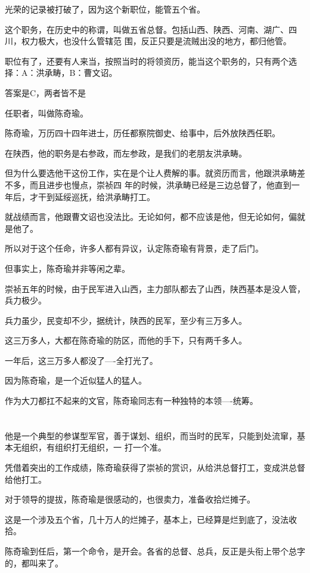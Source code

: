 \documentclass[11pt,a4paper,onecolumn]{article}
\begin{document}
光荣的记录被打破了，因为这个新职位，能管五个省。

这个职务，在历史中的称谓，叫做五省总督。包括山西、陕西、河南、湖广、四川，权力极大，也没什么管辖范
围，反正只要是流贼出没的地方，都归他管。

职位有了，还要有人来当，按照当时的将领资历，能当这个职务的，只有两个选择：A：洪承畴，B：曹文诏。

答案是C，两者皆不是

任职者，叫做陈奇瑜。

陈奇瑜，万历四十四年进士，历任都察院御史、给事中，后外放陕西任职。

在陕西，他的职务是右参政，而左参政，是我们的老朋友洪承畴。

但为什么要选他干这份工作，实在是个让人费解的事。就资历而言，他跟洪承畴差不多，而且进步也慢点，崇祯四
年的时候，洪承畴已经是三边总督了，他直到一年后，才干到延绥巡抚，给洪承畴打工。

就战绩而言，他跟曹文诏也没法比。无论如何，都不应该是他，但无论如何，偏就是他了。

所以对于这个任命，许多人都有异议，认定陈奇瑜有背景，走了后门。

但事实上，陈奇瑜并非等闲之辈。

崇祯五年的时候，由于民军进入山西，主力部队都去了山西，陕西基本是没人管，兵力极少。

兵力虽少，民变却不少，据统计，陕西的民军，至少有三万多人。

这三万多人，大都在陈奇瑜的防区，而他的手下，只有两千多人。

一年后，这三万多人都没了----全打光了。

因为陈奇瑜，是一个近似猛人的猛人。

作为大刀都扛不起来的文官，陈奇瑜同志有一种独特的本领----统筹。

\section[\thesection]{}

他是一个典型的参谋型军官，善于谋划、组织，而当时的民军，只能到处流窜，基本无组织，有组织打无组织，一
打一个准。

凭借着突出的工作成绩，陈奇瑜获得了崇祯的赏识，从给洪总督打工，变成洪总督给他打工。

对于领导的提拔，陈奇瑜是很感动的，也很卖力，准备收拾烂摊子。

这是一个涉及五个省，几十万人的烂摊子，基本上，已经算是烂到底了，没法收拾。

陈奇瑜到任后，第一个命令，是开会。各省的总督、总兵，反正是头衔上带个总字的，都叫来了。
\end{document}
